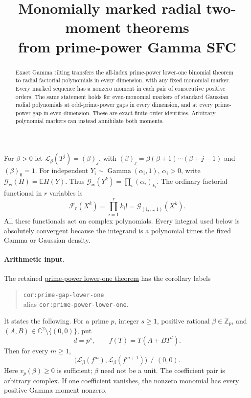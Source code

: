 \documentclass[11pt]{article}
\title{Monomially marked radial two-moment theorems\\from prime-power Gamma SFC}
\author{}\date{}
\newcommand{\C}{\mathbb C}
\newcommand{\E}{\mathbb E}
\newcommand{\Lbeta}{\mathcal L}
\begin{document}
\maketitle
\begin{abstract}
Exact Gamma tilting transfers the all-index prime-power lower-one
binomial theorem to radial factorial polynomials in every dimension,
with any fixed monomial marker. Every marked sequence has a nonzero
moment in each pair of consecutive positive orders. The same statement
holds for even-monomial markers of standard Gaussian radial polynomials
at odd-prime-power gaps in every dimension, and at every prime-power gap
in even dimension. These are exact finite-order identities.
Arbitrary polynomial markers can instead annihilate both moments.
\end{abstract}

For $\beta>0$ let $\Lbeta_\beta(T^j)=(\beta)_j$, with
$(\beta)_j=\beta(\beta+1)\cdots(\beta+j-1)$ and $(\beta)_0=1$.
For independent $Y_i\sim\operatorname{Gamma}(\alpha_i,1)$,
$\alpha_i>0$, write $\mathcal G_{\boldsymbol\alpha}(H)=\E H(Y)$.
Thus $\mathcal G_{\boldsymbol\alpha}(Y^k)=\prod_i(\alpha_i)_{k_i}$.
The ordinary factorial functional in $r$ variables is
\[
 \mathcal F_r(X^k)=\prod_{i=1}^r k_i!
                  =\mathcal G_{(1,\ldots,1)}(X^k).
\]
All these functionals act on complex polynomials. Every integral used
below is absolutely convergent because the integrand is a polynomial
times the fixed Gamma or Gaussian density.

\paragraph{Arithmetic input.}
The retained
\href{ARITHMETIC_FRONTIER_TERMINAL_ORDERS.tex}{prime-power lower-one theorem}
has the corollary labels
\begin{quote}
\texttt{cor:prime-gap-lower-one}\\
alias \texttt{cor:prime-power-lower-one}.
\end{quote}
It states the following. For a prime $p$, integer $s\ge1$, positive rational
$\beta\in\mathbb Z_p$, and $(A,B)\in\C^2\setminus\{(0,0)\}$, put
\[
 d=p^s,\qquad f(T)=T(A+BT^d).
\]
Then for every $m\ge1$,
\[
 \bigl(\Lbeta_\beta(f^m),\Lbeta_\beta(f^{m+1})\bigr)\ne(0,0).
 \tag{1}
\]
Here $v_p(\beta)\ge0$ is sufficient; $\beta$ need not be a unit.
The coefficient pair is arbitrary complex. If one coefficient vanishes,
the nonzero monomial has every positive Gamma moment nonzero.
\end{document}
